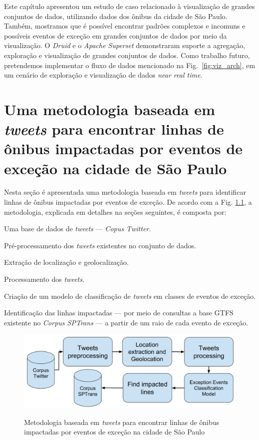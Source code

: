 \documentclass[
	12pt,				%
	oneside,			%
	a4paper,			%
	english,			%
	brazil				%
	]{abntex2ppgsi}
\begin{document}
Este capítulo apresentou um estudo de caso relacionado à visualização de grandes conjuntos de dados, utilizando dados dos ônibus da cidade de São Paulo. Também, mostramos que é possível encontrar padrões complexos e incomuns e possíveis eventos de exceção em grandes conjuntos de dados por meio da visualização. O \textit{Druid} e o \textit{Apache Superset} demonstraram suporte a agregação, exploração e visualização de grandes conjuntos de dados. Como trabalho futuro, pretendemos implementar o fluxo de dados mencionado na Fig.~\ref{fig:viz_arch}, em um cenário de exploração e visualização de dados \textit{near real time}.


\chapter{Uma metodologia baseada em \textit{tweets} para encontrar linhas de ônibus impactadas por eventos de exceção na cidade de São Paulo}
\label{exp1}

Nesta seção é apresentada uma metodologia baseada em \textit{tweets} para identificar linhas de ônibus impactadas por eventos de exceção. De acordo com a Fig. \ref{fig:tweet_based_methodology}, a metodologia, explicada em detalhes na seções seguintes, é composta por:
\begin{enumerate*}
\item Uma base de dados de \textit{tweets} --- \textit{Copus Twitter}.
\item Pré-processamento dos \textit{tweets} existentes no conjunto de dados.
\item Extração de localização e geolocalização.
\item Processamento dos \textit{tweets}.
\item Criação de um modelo de classificação de \textit{tweets} em classes de eventos de exceção.
\item Identificação das linhas impactadas --- por meio de consultas a base GTFS existente no \textit{Corpus SPTrans} --- a partir de um raio de cada evento de exceção.
\end{enumerate*}

\begin{figure}[!htb]
	\centering
 	  \caption{Metodologia baseada em \textit{tweets} para encontrar linhas de ônibus impactadas por eventos de exceção na cidade de São Paulo}
		\includegraphics[width=0.7\linewidth]{images/tweet_based_methodology.png}
	\label{fig:tweet_based_methodology}
\end{figure}
\end{document}
